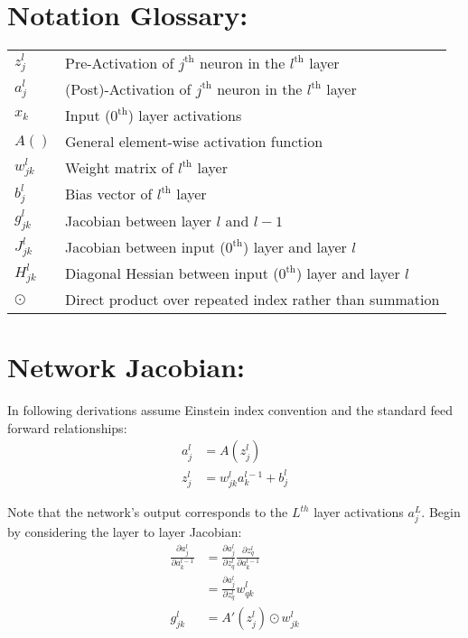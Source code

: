 \documentclass{article}
\begin{document}
\section*{Notation Glossary:}
\begin{tabular}{ll}
\(z_j^l\) & Pre-Activation of $j^{\text{th}}$ neuron in the $l^{\text{th}}$ layer \\[0.5em]
\(a_j^l\) & (Post)-Activation of $j^{\text{th}}$ neuron in the $l^{\text{th}}$ layer \\[0.5em]
\(x_k\) & Input ($0^{\text{th}}$) layer activations \\[0.5em]
$A()$ & General element-wise activation function \\[0.5em]
\(w_{jk}^l\) & Weight matrix of $l^{\text{th}}$ layer \\[0.5em]
\(b_j^l\) & Bias vector of $l^{\text{th}}$ layer \\[0.5em]
\(g_{jk}^l\) & Jacobian between layer \(l\) and \(l-1\) \\[0.5em]
\(J_{jk}^l\) & Jacobian between input ($0^{\text{th}}$) layer and layer \(l\) \\[0.5em]
\(H_{jk}^l\) & Diagonal Hessian between input ($0^{\text{th}}$) layer and layer \(l\) \\[0.5em]
\(\odot\) & Direct product over repeated index rather than summation \\[0.5em]
\end{tabular}

\section*{Network Jacobian:}
In following derivations assume Einstein index convention and the standard feed forward relationships:
\begin{align}
a_j^l &= A(z_j^l) \\
z_j^l &= w_{jk}^la_k^{l-1} + b_j^l
\end{align}

Note that the network's output corresponds to the \(L^{th}\) layer activations \(a_j^L\). Begin by considering the layer to layer Jacobian:
\begin{align}
\frac{\partial a_j^l}{\partial a_k^{l-1}} &= \frac{\partial a_j^l}{\partial z_q^l} \frac{\partial z_q^l}{\partial a_k^{l-1}} \\
&= \frac{\partial a_j^l}{\partial z_q^l} w_{qk}^l \\
g_{jk}^l &= A'(z_j^l) \odot w_{jk}^l
\end{align}
\end{document}
